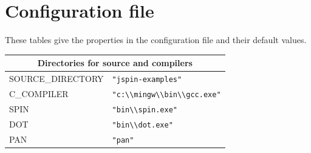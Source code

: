 \documentclass[11pt]{article}
\begin{document}
\section{Configuration file}\label{a.cfg}

These tables give the properties in the configuration file and their
default values.

\begin{center}

\begin{tabular}{|p{}|p{}|}
\hline
\multicolumn{2}{|c|}{Directories for source and compilers}\\ \hline
\textsc{\ttfamily SOURCE\_DIRECTORY} & \verb+"jspin-examples"+ \\
\textsc{\ttfamily C\_COMPILER} &\verb+"c:\\mingw\\bin\\gcc.exe"+ \\
\textsc{\ttfamily SPIN} &\verb+"bin\\spin.exe"+ \\
\textsc{\ttfamily DOT} &\verb+"bin\\dot.exe"+ \\
\textsc{\ttfamily PAN} &\verb+"pan"+ \\ \hline
\end{tabular}

\bigskip


\end{center}
\end{document}
